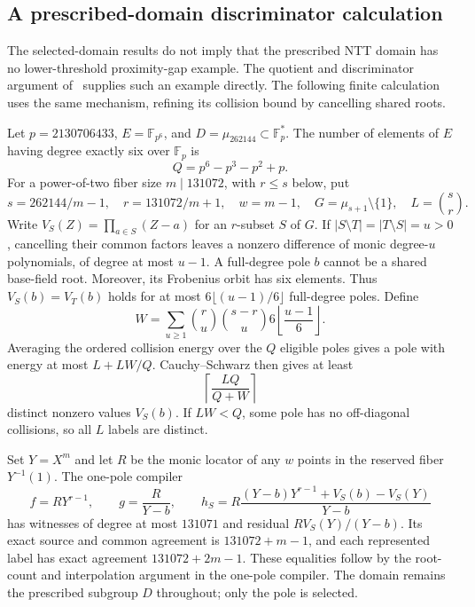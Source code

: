 \subsection{A prescribed-domain discriminator calculation}
\label{subsec:fixed-ntt-discriminator}

The selected-domain results do not imply that the prescribed NTT domain
has no lower-threshold proximity-gap example.  The quotient and
discriminator argument of~\cite[Appendix~A, Lemma~3 and
Proposition~4]{kkh} supplies such an example directly.  The following
finite calculation uses the same mechanism, refining its collision
bound by cancelling shared roots.

Let $p=2130706433$, $E=\mathbb F_{p^6}$, and
$D=\mu_{262144}\subset\mathbb F_p^*$.  The number of elements of
$E$ having degree exactly six over $\mathbb F_p$ is
\[
 Q=p^6-p^3-p^2+p.
\]
For a power-of-two fiber size $m\mid131072$, with $r\le s$ below, put
\[
 s=262144/m-1,\quad r=131072/m+1,\quad w=m-1,
 \quad G=\mu_{s+1}\setminus\{1\},\quad L=\binom sr.
\]
Write $V_S(Z)=\prod_{a\in S}(Z-a)$ for an $r$-subset $S$ of $G$.
If $|S\setminus T|=|T\setminus S|=u>0$, cancelling their common
factors leaves a nonzero difference of monic degree-$u$ polynomials,
of degree at most $u-1$.  A full-degree pole $b$ cannot be a shared
base-field root.  Moreover, its Frobenius orbit has six elements.
Thus $V_S(b)=V_T(b)$ holds for at most
$6\lfloor(u-1)/6\rfloor$ full-degree poles.  Define
\[
 W=\sum_{u\ge1}\binom ru\binom{s-r}u
                      6\left\lfloor\frac{u-1}{6}\right\rfloor.
\]
Averaging the ordered collision energy over the $Q$ eligible poles
gives a pole with energy at most $L+LW/Q$.  Cauchy--Schwarz then
gives at least
\[
 \left\lceil\frac{LQ}{Q+W}\right\rceil
\]
distinct nonzero values $V_S(b)$.  If $LW<Q$, some pole has no
off-diagonal collisions, so all $L$ labels are distinct.

Set $Y=X^m$ and let $R$ be the monic locator of any $w$ points in
the reserved fiber $Y^{-1}(1)$.  The one-pole compiler
\[
 f=RY^{r-1},\qquad g=\frac R{Y-b},\qquad
 h_S=R\frac{(Y-b)Y^{r-1}+V_S(b)-V_S(Y)}{Y-b}
\]
has witnesses of degree at most $131071$ and residual
$RV_S(Y)/(Y-b)$.  Its exact source and common agreement is
$131072+m-1$, and each represented label has exact agreement
$131072+2m-1$.  These equalities follow by the root-count and
interpolation argument in the one-pole compiler.  The domain remains
the prescribed subgroup $D$ throughout; only the pole is selected.

